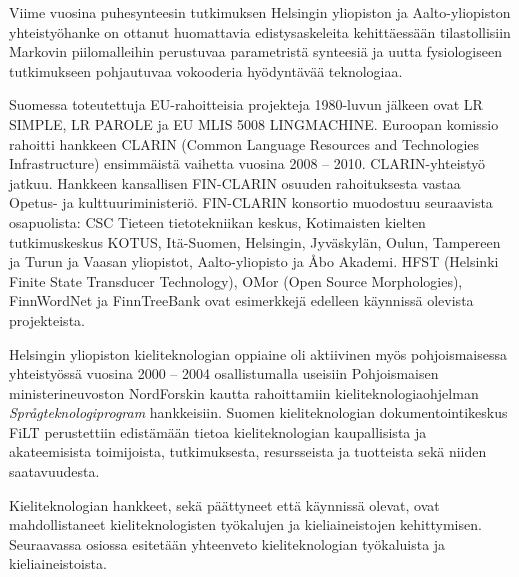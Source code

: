 \documentclass[]{../../metanetpaper}
\begin{document}
\begin{Parallel}[c]{77mm}{77mm}
{Viime vuosina puhesynteesin tutkimuksen Helsingin yliopiston ja
Aalto-yliopiston yhteistyöhanke on ottanut huomattavia
edistysaskeleita kehittäessään tilastollisiin Markovin piilomalleihin
perustuvaa parametristä synteesiä ja uutta fysiologiseen tutkimukseen
pohjautuvaa vokooderia hyödyntävää teknologiaa.

Suomessa toteutettuja EU-rahoitteisia projekteja 1980-luvun jälkeen
ovat LR SIMPLE, LR PAROLE ja EU MLIS 5008 LINGMACHINE. Euroopan
komissio rahoitti hankkeen CLARIN (Common Language Resources and
Technologies Infrastructure) ensimmäistä vaihetta vuosina 2008 –
2010. CLARIN-yhteistyö jatkuu. Hankkeen kansallisen FIN-CLARIN osuuden
rahoituksesta vastaa Opetus- ja kulttuuriministeriö. FIN-CLARIN
konsortio muodostuu seuraavista osapuolista: CSC Tieteen
tietotekniikan keskus, Kotimaisten kielten tutkimuskeskus KOTUS,
Itä-Suomen, Helsingin, Jyväskylän, Oulun, Tampereen ja Turun ja Vaasan
yliopistot, Aalto-yliopisto ja Åbo Akademi. HFST (Helsinki Finite
State Transducer Technology), OMor (Open Source Morphologies),
FinnWordNet ja FinnTreeBank ovat esimerkkejä edelleen käynnissä
olevista projekteista.

Helsingin yliopiston kieliteknologian oppiaine oli aktiivinen myös
pohjoismaisessa yhteistyössä vuosina 2000 – 2004 osallistumalla
useisiin Pohjoismaisen ministerineuvoston NordForskin kautta
rahoittamiin kieliteknologiaohjelman \textit{Språgteknologiprogram}
hankkeisiin. Suomen kieliteknologian dokumentointikeskus FiLT
perustettiin edistämään tietoa kieliteknologian kaupallisista ja
akateemisista toimijoista, tutkimuksesta, resursseista ja tuotteista
sekä niiden saatavuudesta.

Kieliteknologian hankkeet, sekä päättyneet että käynnissä olevat, ovat
mahdollistaneet kieliteknologisten työkalujen ja kieliaineistojen
kehittymisen.  Seuraavassa osiossa esitetään yhteenveto
kieliteknologian työkaluista ja kieliaineistoista.
}

\end{Parallel}
\end{document}

